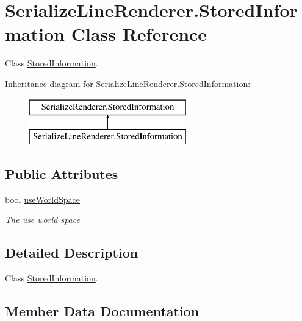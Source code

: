 \hypertarget{class_serialize_line_renderer_1_1_stored_information}{}\section{Serialize\+Line\+Renderer.\+Stored\+Information Class Reference}
\label{class_serialize_line_renderer_1_1_stored_information}


Class \hyperlink{class_serialize_line_renderer_1_1_stored_information}{Stored\+Information}.  


Inheritance diagram for Serialize\+Line\+Renderer.\+Stored\+Information\+:\begin{figure}[H]
\begin{center}
\leavevmode
\includegraphics[height=2.000000cm]{class_serialize_line_renderer_1_1_stored_information}
\end{center}
\end{figure}
\subsection*{Public Attributes}
\begin{DoxyCompactItemize}
\item 
bool \hyperlink{class_serialize_line_renderer_1_1_stored_information_aba7c4f96fcbcc3232ab5a7a1f9a6130c}{use\+World\+Space}
\begin{DoxyCompactList}\small\item\em The use world space \end{DoxyCompactList}\end{DoxyCompactItemize}


\subsection{Detailed Description}
Class \hyperlink{class_serialize_line_renderer_1_1_stored_information}{Stored\+Information}. 



\subsection{Member Data Documentation}
\mbox{\label{class_serialize_line_renderer_1_1_stored_information_aba7c4f96fcbcc3232ab5a7a1f9a6130c}} 
